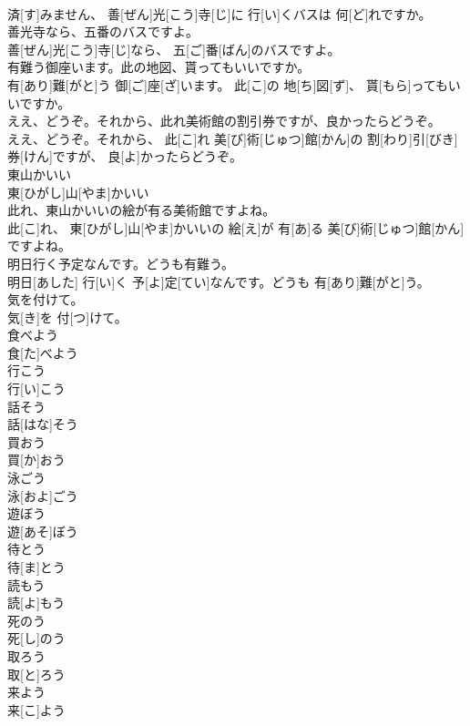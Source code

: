 \documentclass[8pt]{extreport}
\begin{document}
\begin{CJK}{UTF8}{min}
\\	済[す]みません、 善[ぜん]光[こう]寺[じ]に 行[い]くバスは 何[ど]れですか。
\\	善光寺なら、五番のバスですよ。	
\\	善[ぜん]光[こう]寺[じ]なら、 五[ご]番[ばん]のバスですよ。
\\	有難う御座います。此の地図、貰ってもいいですか。	
\\	有[あり]難[がと]う 御[ご]座[ざ]います。 此[こ]の 地[ち]図[ず]、 貰[もら]ってもいいですか。
\\	ええ、どうぞ。それから、此れ美術館の割引券ですが、良かったらどうぞ。	
\\	ええ、どうぞ。それから、 此[こ]れ 美[び]術[じゅつ]館[かん]の 割[わり]引[びき]券[けん]ですが、 良[よ]かったらどうぞ。
\\	東山かいい	
\\	東[ひがし]山[やま]かいい	
\\	此れ、東山かいいの絵が有る美術館ですよね。	
\\	此[こ]れ、 東[ひがし]山[やま]かいいの 絵[え]が 有[あ]る 美[び]術[じゅつ]館[かん]ですよね。
\\	明日行く予定なんです。どうも有難う。	
\\	明日[あした] 行[い]く 予[よ]定[てい]なんです。どうも 有[あり]難[がと]う。
\\	気を付けて。	
\\	気[き]を 付[つ]けて。
\\	食べよう	
\\	食[た]べよう
\\	行こう	
\\	行[い]こう
\\	話そう	
\\	話[はな]そう
\\	買おう	
\\	買[か]おう
\\	泳ごう	
\\	泳[およ]ごう
\\	遊ぼう	
\\	遊[あそ]ぼう
\\	待とう	
\\	待[ま]とう
\\	読もう	
\\	読[よ]もう
\\	死のう	
\\	死[し]のう
\\	取ろう	
\\	取[と]ろう
\\	来よう	
\\	来[こ]よう

\end{CJK}
\end{document}
